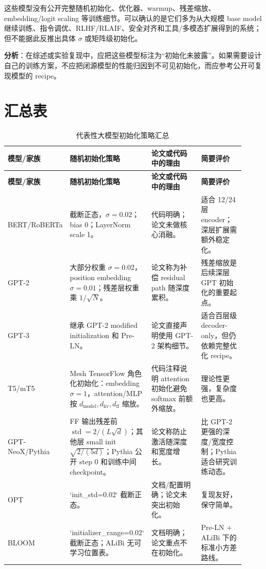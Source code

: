\documentclass[UTF8,a4paper,11pt]{ctexart}
\newcommand{\std}{\operatorname{std}}
\begin{document}
这些模型没有公开完整随机初始化、优化器、warmup、残差缩放、embedding/logit scaling 等训练细节。可以确认的是它们多为从大规模 base model 继续训练、指令调优、RLHF/RLAIF、安全对齐和工具/多模态扩展得到的系统；但不能据此反推出具体 $\sigma$ 或矩阵级初始化。

\textbf{分析}：在综述或实验复现中，应把这些模型标注为“初始化未披露”。如果需要设计自己的训练方案，不应把闭源模型的性能归因到不可见初始化，而应参考公开可复现模型的 recipe。

\section{汇总表}

\small
\begin{longtable}{p{0.16\linewidth}p{0.31\linewidth}p{0.25\linewidth}p{0.20\linewidth}}
\caption{代表性大模型初始化策略汇总}\\
\toprule
\textbf{模型/家族} & \textbf{随机初始化策略} & \textbf{论文或代码中的理由} & \textbf{简要评价}\\
\midrule
\endfirsthead
\toprule
\textbf{模型/家族} & \textbf{随机初始化策略} & \textbf{论文或代码中的理由} & \textbf{简要评价}\\
\midrule
\endhead
BERT/RoBERTa & 截断正态，$\sigma=0.02$；bias 0；LayerNorm scale 1。 & 代码明确；论文未做核心消融。 & 适合 12/24 层 encoder；深层扩展需额外稳定化。\\
GPT-2 & 大部分权重 $\sigma=0.02$，position embedding $\sigma=0.01$；残差层权重乘 $1/\sqrt{N}$。 & 论文称为补偿 residual path 随深度累积。 & 残差缩放是后续深层 GPT 初始化的重要起点。\\
GPT-3 & 继承 GPT-2 modified initialization 和 Pre-LN。 & 论文直接声明使用 GPT-2 架构细节。 & 适合百层级 decoder-only，但仍依赖完整优化 recipe。\\
T5/mT5 & Mesh TensorFlow 角色化初始化：embedding $\sigma=1$，attention/MLP 按 $d_{\mathrm{model}},d_{\mathrm{kv}},d_{\mathrm{ff}}$ 缩放。 & 代码注释说明 attention 初始化避免 softmax 前额外缩放。 & 理论性更强，复杂度也更高。\\
GPT-NeoX/Pythia & FF 输出残差前 $\std=2/(L\sqrt d)$；其他层 small init $\sqrt{2/(5d)}$；Pythia 公开 step 0 和训练中间 checkpoint。 & 论文称防止激活随深度和宽度增长。 & 比 GPT-2 更强的深度/宽度控制；Pythia 适合研究训练动态。\\
OPT & `init\_std=0.02` 截断正态。 & 文档/配置明确；论文未突出初始化。 & 复现友好，保守简单。\\
BLOOM & `initializer\_range=0.02` 截断正态；ALiBi 无可学习位置表。 & 文档明确；论文重点不在初始化。 & Pre-LN + ALiBi 下的标准小方差路线。\\

\end{longtable}
\end{document}
